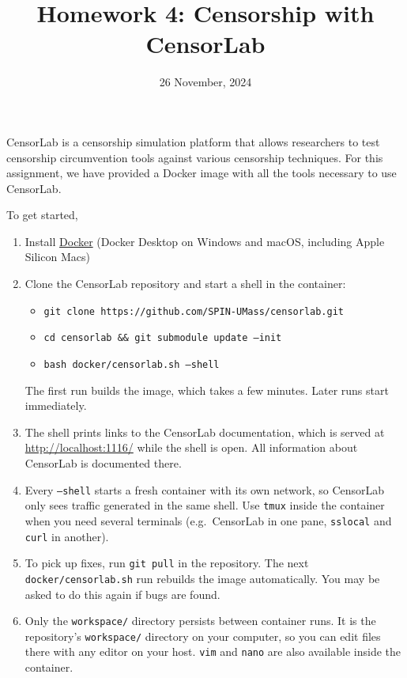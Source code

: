 \documentclass[12pt]{article}
\begin{document}
 
 
\title{Homework 4: Censorship with CensorLab}
\date{26 November, 2024}
\maketitle

CensorLab is a censorship simulation platform that allows researchers to test censorship circumvention tools against various censorship techniques. For this assignment, we have provided a Docker image with all the tools necessary to use CensorLab.


To get started,
\begin{enumerate}
    \item Install \href{https://docs.docker.com/get-docker/}{Docker} (Docker Desktop on Windows and macOS, including Apple Silicon Macs)
    \item Clone the CensorLab repository and start a shell in the container:
    \begin{itemize}
        \item \texttt{git clone https://github.com/SPIN-UMass/censorlab.git}
        \item \texttt{cd censorlab \&\& git submodule update --init}
        \item \texttt{bash docker/censorlab.sh --shell}
    \end{itemize}
    The first run builds the image, which takes a few minutes. Later runs start immediately.
    \item The shell prints links to the CensorLab documentation, which is served at \url{http://localhost:1116/} while the shell is open. All information about CensorLab is documented there.
    \item Every \texttt{--shell} starts a fresh container with its own network, so CensorLab only sees traffic generated in the same shell. Use \texttt{tmux} inside the container when you need several terminals (e.g.\ CensorLab in one pane, \texttt{sslocal} and \texttt{curl} in another).
    \item To pick up fixes, run \texttt{git pull} in the repository. The next \texttt{docker/censorlab.sh} run rebuilds the image automatically. You may be asked to do this again if bugs are found.
    \item Only the \texttt{workspace/} directory persists between container runs. It is the repository's \texttt{workspace/} directory on your computer, so you can edit files there with any editor on your host. \texttt{vim} and \texttt{nano} are also available inside the container.

\end{enumerate}
\end{document}
